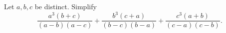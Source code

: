 Let $a,b,c$ be distinct. Simplify
\[
\dfrac{a^3(b+c)}{(a-b)(a-c)}+\dfrac{b^3(c+a)}{(b-c)(b-a)}+\dfrac{c^3(a+b)}{(c-a)(c-b)}.
\]
